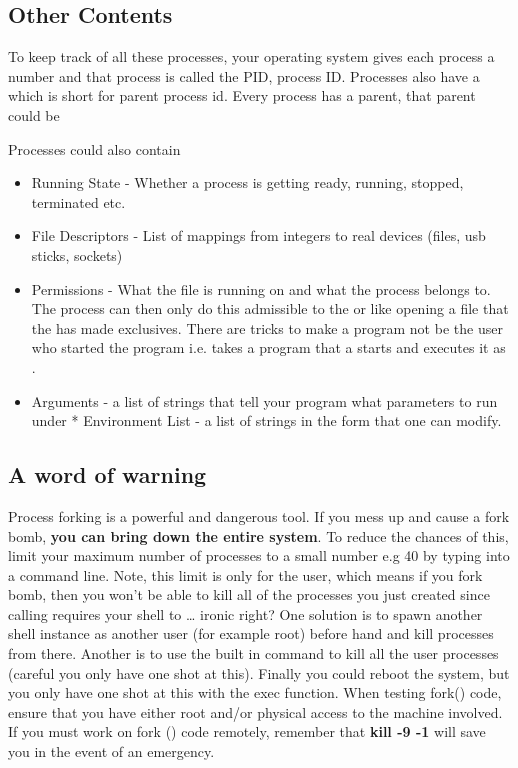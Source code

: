 \subsection{Other Contents}\label{process-id-pid}

To keep track of all these processes, your operating system gives each process a number and that process is called the PID, process ID. Processes also have a  which is short for parent process id. Every process has a parent, that parent could be 

Processes could also contain 
\begin{itemize}
\item Running State - Whether a process is getting ready, running, stopped, terminated etc. 
\item File Descriptors - List of mappings from integers to real devices (files, usb sticks, sockets) 
\item Permissions - What  the file is running on and what  the process belongs to. The process can then only do this admissible to the  or  like opening a file that the  has made exclusives. There are tricks to make a program not be the user who started the program i.e.  takes a program that a  starts and executes it as . 
\item Arguments - a list of strings that tell your program what parameters to run under * Environment List - a list of strings in the form  that one can modify.
\end{itemize}

\subsection{A word of warning}\label{a-word-of-warning}

Process forking is a powerful and dangerous tool. If you mess up and cause a fork bomb, \textbf{you can bring down the entire system}. To reduce the chances of this, limit your maximum number of processes to a small number e.g 40 by typing  into a command line. Note, this limit is only for the user, which means if you fork bomb, then you won't be able to kill all of the processes you just created since calling  requires your shell to  \ldots{} ironic right? One solution is to spawn another shell instance as another user (for example root) before hand and kill processes from there. Another is to use the built in  command to kill all the user processes (careful you only have one shot at this). Finally you could reboot the system, but you only have one shot at this with the exec function. When testing fork() code, ensure that you have either root and/or physical access to the machine involved. If you must work on fork () code remotely, remember that \textbf{kill -9 -1} will save you in the event of an emergency.

